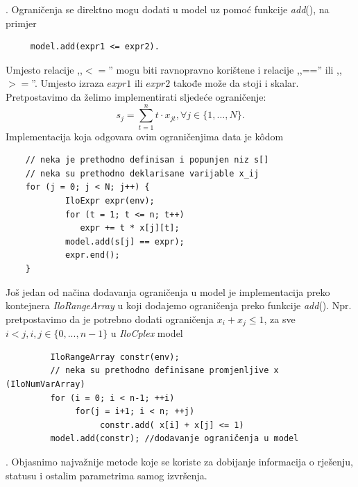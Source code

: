 \documentclass[a4paper, utf8, 11pt, colorlinks]{book}
\theoremstyle{definition}
\begin{document}
 . Ograničenja se direktno mogu dodati  u model uz pomoć funkcije \emph{add}(), na primjer
 \begin{verbatim}
 	 model.add(expr1 <= expr2).
 \end{verbatim} 	 
 	  Umjesto relacije ,,$<=$'' mogu biti ravnopravno korištene i relacije ,,=='' ili ,,$>=$''. Umjesto izraza $expr1$ ili $expr2$ takođe može da stoji i skalar. Pretpostavimo da želimo implementirati sljedeće ograničenje:
 $$s_j = \sum_{t=1}^n t \cdot x_{jt}, \forall j \in \{1,\ldots,N\}.$$ 
 Implementacija koja odgovara ovim ograničenjima data je k\^odom
 \begin{verbatim}
 	// neka je prethodno definisan i popunjen niz s[]
 	// neka su prethodno deklarisane varijable x_ij
 	for (j = 0; j < N; j++) {
 		    IloExpr expr(env);
 		    for (t = 1; t <= n; t++)
 	  	       expr += t * x[j][t];            
 		    model.add(s[j] == expr);
 		    expr.end();
 	}
 \end{verbatim}
 Još jedan od načina dodavanja ograničenja u model je implementacija preko kontejnera \emph{IloRangeArray} u koji dodajemo ograničenja preko funkcije \emph{add}().   
 Npr. pretpostavimo da je potrebno dodati ograničenja $x_i + x_j \leq 1$, za sve $i<j, i,j \in \{0,...,n-1\}$ u \emph{IloCplex} model
 
 \begin{verbatim}
 	     IloRangeArray constr(env);
 	     // neka su prethodno definisane promjenljive x (IloNumVarArray) 
 	     for (i = 0; i < n-1; ++i)
 	          for(j = i+1; i < n; ++j)
 	               constr.add( x[i] + x[j] <= 1)     
      	 model.add(constr); //dodavanje ograničenja u model
 \end{verbatim}
 
 . Objasnimo najvažnije metode koje se koriste za dobijanje informacija o  rješenju, statusu i ostalim parametrima samog izvršenja.
  
\end{document}

